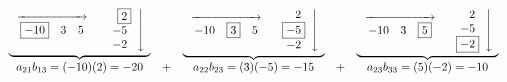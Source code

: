 \documentclass{ximera}
\begin{document}
\[ \begin{array}{ccccc}

\underbrace{\begin{array}{rl} \stackrel{\xrightarrow{\hspace{.75in}}}{\begin{array}{ccc} \fbox{$-10$} &  3 & 5 \end{array}} & \left. \begin{array}{c} \hphantom{-}\fbox{2}  \\ -5   \\ -2  \\ \end{array} \right\downarrow \\ \end{array}}

&

&

\underbrace{\begin{array}{rl} \stackrel{\xrightarrow{\hspace{.75in}}}{\begin{array}{ccc} -10 & \fbox{3} & 5 \end{array}} &  \left.  \begin{array}{c} \hphantom{-}2 \\ \fbox{$-5$}    \\ -2  \\ \end{array} \right\downarrow \\\end{array}}

& 


&


\underbrace{\begin{array}{rl} \stackrel{\xrightarrow{\hspace{.75in}}}{\begin{array}{ccc} -10 & 3 & \fbox{$5$} \end{array}} &  \left. \begin{array}{c} \hphantom{-}2 \\ -5 \\ \fbox{$-2$}   \\ \end{array} \right\downarrow \\ \end{array}}   \\

a_{21}b_{13}= (-10)(2) = -20 & + & a_{22}b_{23} = (3)(-5)  = -15 & + & a_{23}b_{33} = (5)(-2)  = -10 \\

\end{array}\]
\end{document}
